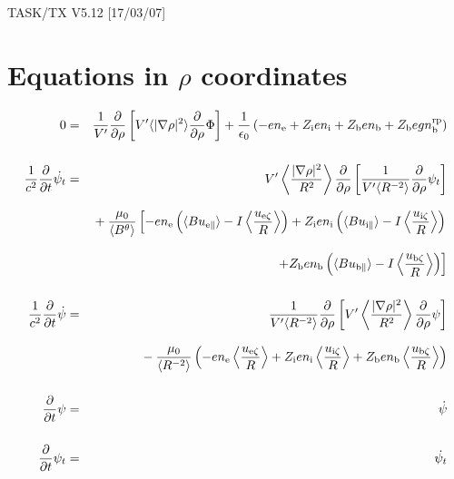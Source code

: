 \documentclass[11pt]{article}
\def\r#1{{\rm#1}}
\def\ave#1{\left\langle#1\right\rangle}
\def\aves#1{\langle#1\rangle}
\def\para{\parallel}
\def\ddrho{\frac{\partial}{\partial\rho}}
\def\gradrho2{\aves{|\nabla\rho|^2}}
\def\psid{\dot{\psi}}
\def\psit{\psi_t}
\def\psitd{\dot{\psit}}
\def\nee{n_\r{e}}
\def\ni{n_\r{i}}
\def\nb{n_\r{b}}
\def\Zi{Z_\r{i}}
\def\Zb{Z_\r{b}}
\def\uezt{u_{\r{e}\zeta}}
\def\uizt{u_{\r{i}\zeta}}
\def\ubzt{u_{\r{b}\zeta}}
\def\uepara{u_{\r{e}\para}}
\def\uipara{u_{\r{i}\para}}
\def\ubpara{u_{\r{b}\para}}
\def\ddt{\frac{\partial}{\partial t}}
\def\nbrp{n_\r{b}^\r{rp}}
\begin{document}
\begin{center}
TASK/TX V5.12 [17/03/07]
\end{center}

\section{Equations in $\rho$ coordinates}
\vspace{-5mm}

%
\begin{eqnarray}
  0 &=&
%
    \frac{1}{V'} \ddrho \left[ V' \gradrho2 \ddrho{\Phi} \right]
%
  + \frac{1}{\epsilon_0}
%
    \left(-e \nee + \Zi e \ni + \Zb e \nb + \Zb e g \nbrp \right)
\\[5mm]
  \frac{1}{c^2} \ddt \psitd &=&
%
    V' \ave{\frac{|\nabla\rho|^2}{R^2}} \ddrho \left[ \frac{1}{V'\aves{R^{-2}}}
				         \ddrho \psit \right] \nonumber\\[3mm]&&{}
%
  + \frac{\mu_0}{\aves{B^\theta}}
%
    \left[-     e \nee \left( \aves{B\uepara} - I\ave{\frac{\uezt}{R}} \right)
          + \Zi e \ni  \left( \aves{B\uipara} - I\ave{\frac{\uizt}{R}} \right)
    \right.\nonumber\\[3mm]&&{}
    \left.+ \Zb e \nb  \left( \aves{B\ubpara} - I\ave{\frac{\ubzt}{R}} \right) \right]
\\[5mm]
  \frac{1}{c^2} \ddt \psid &=&
%
  \frac{1}{V'\aves{R^{-2}}} \ddrho \left[ V'
				    \ave{\frac{|\nabla\rho|^2}{R^2}}
				    \ddrho \psi \right] \nonumber\\[3mm]&&{}
%
  - \frac{\mu_0}{\aves{R^{-2}}} \left(-e \nee \ave{\frac{\uezt}{R}} +
				 \Zi e \ni \ave{\frac{\uizt}{R}} + \Zb e
				 \nb \ave{\frac{\ubzt}{R}} \right)
%
\\[5mm]
  \ddt \psi &=&
%
  \psid
\\[5mm]
  \ddt \psit &=&
%
  \psitd
\end{eqnarray}
%

\end{document}
